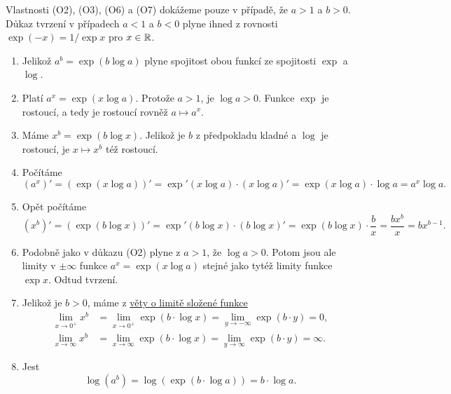 \begin{propproof}
 Vlastnosti (O2), (O3), (O6) a (O7) dokážeme pouze v případě, že $a > 1$ a $b >
 0$. Důkaz tvrzení v případech $a < 1$ a $b < 0$ plyne ihned z rovnosti
 $\exp(-x) = 1 / \exp x$ pro $x \in \mathbb{R}$.
  
 \begin{enumerate}[label=(O\arabic*)]
  \item Jelikož $a^{b} = \exp(b \log a)$ plyne spojitost obou funkcí ze
   spojitosti $\exp$ a $\log$.
  \item Platí $a^{x} = \exp(x \log a)$. Protože $a > 1$, je $\log a > 0$. Funkce
   $\exp$ je rostoucí, a tedy je rostoucí rovněž $a \mapsto a^{x}$.
  \item Máme $x^{b} = \exp(b \log x)$. Jelikož je $b$ z předpokladu kladné a
   $\log$ je rostoucí, je $x \mapsto x^{b}$ též rostoucí.
  \item Počítáme
   \[
    (a^{x})' = (\exp(x \log a))' = \exp'(x \log a) \cdot (x \log a)' = \exp(x
    \log a) \cdot \log a = a^{x} \log a.
   \]
  \item Opět počítáme
   \[
    (x^{b})' = (\exp(b\log x))' = \exp'(b \log x) \cdot (b\log x)' = \exp(b \log
    x) \cdot \frac{b}{x} = \frac{bx^{b}}{x} = bx^{b-1}.
   \]
  \item Podobně jako v důkazu (O2) plyne z $a > 1$, že $\log a > 0$. Potom jsou
   ale limity v $ \pm \infty$ funkce $a^{x} = \exp(x \log a)$ stejné jako tytéž
   limity funkce $\exp x$. Odtud tvrzení.
  \item Jelikož je $b > 0$, máme z \hyperref[thm:limita-slozene-funkce]{věty o
   limitě složené funkce} 
   \begin{align*}
    \lim_{x \to 0^{+}} x^{b} &= \lim_{x \to 0^{+}} \exp(b \cdot \log x) = \lim_{y
    \to -\infty} \exp(b \cdot y) = 0,\\
     \lim_{x \to \infty} x^{b} &= \lim_{x \to \infty} \exp(b \cdot \log x) =
     \lim_{y \to \infty} \exp(b \cdot y) = \infty.
   \end{align*}
  \item Jest
   \[
    \log(a^{b}) = \log(\exp(b \cdot \log a)) = b \cdot \log a.
   \]
 \end{enumerate}
\end{propproof}

